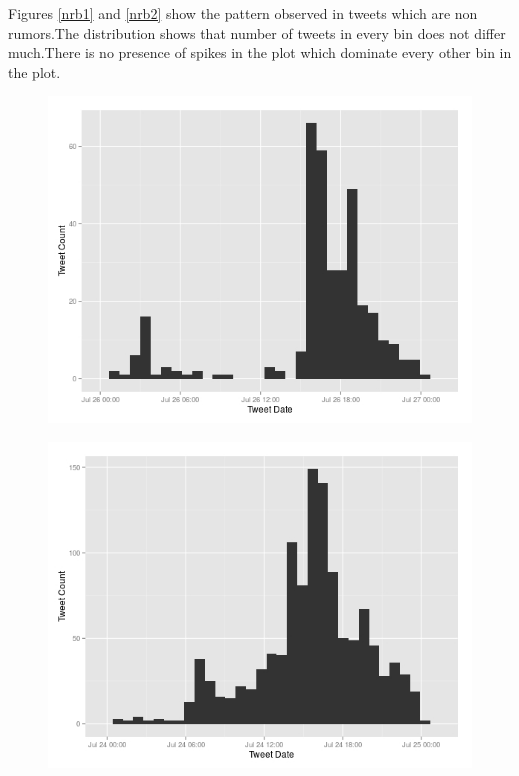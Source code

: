   Figures \ref{nrb1} and \ref{nrb2} show the pattern observed in tweets which are non rumors.The distribution shows that number of tweets in every bin does not differ much.There is no presence of spikes in the plot which dominate every other bin in the plot.
 
  \begin{figure}[H]
  	\centering
  	\begin{minipage}{.45\linewidth}
  		\includegraphics[width=\linewidth]{images/rumorburst1.jpeg}
  		\label{rb1}
  	\end{minipage}
  	\hspace{.05\linewidth}
  	\begin{minipage}{.45\linewidth}
  		\includegraphics[width=\linewidth]{images/rumorburst3.jpeg}
  		\label{rb2}
  	\end{minipage}
  \end{figure}	
  
